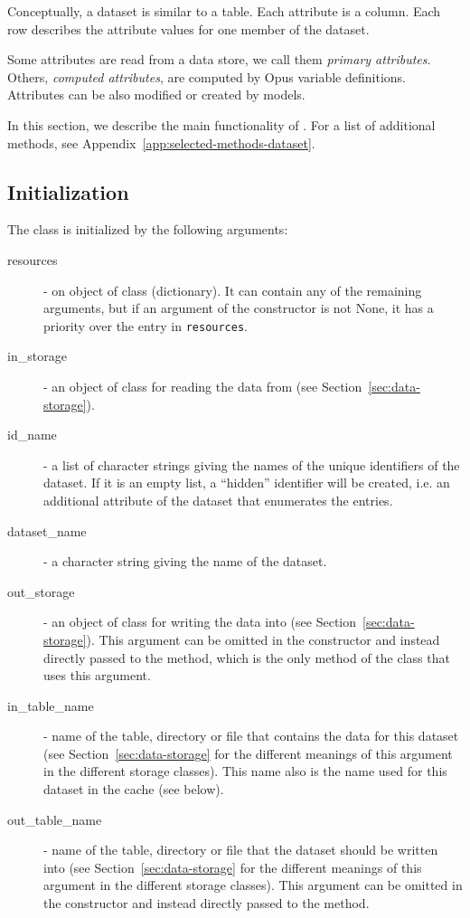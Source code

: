 Conceptually, a dataset \datasetindex is similar to a table.  Each attribute \attributesindex is a column.
Each row describes the attribute values for one member of the dataset. \datasetindex

Some attributes \attributesindex are read from a data store, we call them {\it primary
  attributes}. \primaryattributesindex  Others, {\it computed attributes}, \computedattributesindex are computed by Opus
variable definitions.  Attributes \attributesindex can be also modified or created by models.

In this section, we describe the main functionality of . For a list of additional methods, 
see Appendix~\ref{app:selected-methods-dataset}.

%
\subsection{Initialization}
%
The  \datasetindex class is initialized by the following arguments:
\begin{description}
\item[resources]  - on object of class  (dictionary). It can
  contain any of the remaining arguments, but if an argument of the
  constructor is not None, it has a priority over the entry in
  \verb|resources|.
\item[in_storage]  - an object of class  for reading the data
  from (see Section~\ref{sec:data-storage}).
\item[id_name]  - a list of character strings giving the names of the unique
  identifiers of the dataset. \datasetindex If it is an empty list, a ``hidden'' identifier
  will be created, i.e. an additional attribute of the dataset that enumerates the entries.
\item[dataset_name]  - a character string giving the name of the dataset. \datasetindex
\item[out_storage]  - an object of class  for writing the data
  into (see Section~\ref{sec:data-storage}). This argument can be omitted in
  the constructor and instead directly passed to the
   method, which is the only method of the class that uses this argument.
\item[in_table_name]  - name of the table, directory or file that contains the
  data for this dataset \datasetindex (see Section~\ref{sec:data-storage} for the different
  meanings of this argument in the different storage classes).  This name also is the
  name used for this dataset \datasetindex in the cache (see below).
\item[out_table_name]  - name of the table, directory or file that the dataset \datasetindex
  should be written into (see Section~\ref{sec:data-storage} for the different
  meanings of this argument in the different storage classes). This argument
  can be omitted in the constructor and instead directly passed to the
   method.
\end{description}

